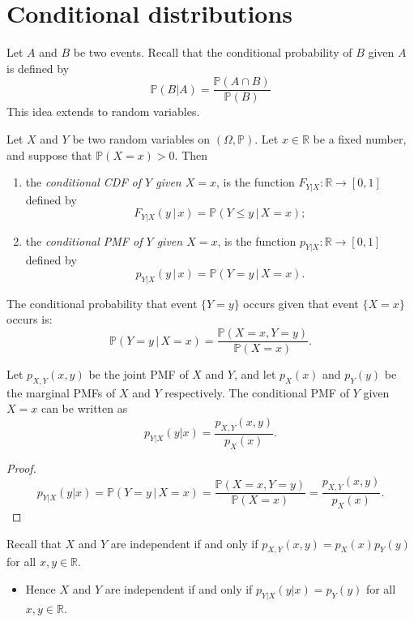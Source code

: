 \documentclass[lecture]{csm}
\newcommand{\R}{\mathbb{R}}
\newcommand{\prob}{\mathbb{P}}
\def\it{\item}
\def\bit{\begin{itemize}}
\def\eit{\end{itemize}}
\def\ben{\begin{enumerate}}
\def\een{\end{enumerate}}
\begin{document}
\maketitle
\tableofcontents


\section{Conditional distributions}
Let $A$ and $B$ be two events. Recall that the conditional probability of $B$ given $A$ is defined by
\[
\prob(B|A) = \frac{\prob(A\cap B)}{\prob(B)}
\]
This idea extends to random variables. 

\begin{definition}
Let $X$ and $Y$ be two random variables on $(\Omega,\prob)$. Let $x\in\R$ be a fixed number, and suppose that $\prob(X=x)>0$. Then
\ben
\it the \emph{conditional CDF of $Y$ given $X=x$}, is the function $F_{Y|X}:\R\to [0,1]$ defined by 
\[
F_{Y|X}(y\,|\,x) = \prob(Y\leq y\,|\,X=x);
\]
\it the \emph{conditional PMF of $Y$ given $X=x$}, is the function $p_{Y|X}:\R\to [0,1]$ defined by 
\[
p_{Y|X}(y\,|\,x) = \prob(Y=y\,|\,X=x).
\]
\een
\end{definition}
\break %

The conditional probability that event $\{Y=y\}$ occurs given that event $\{X=x\}$ occurs is:
\[
\prob(Y=y\,|\,X=x) = \displaystyle\frac{\prob(X=x,Y=y)}{\prob(X=x)}.
\]
\begin{lemma}
Let $p_{X,Y}(x,y)$ be the joint PMF of $X$ and $Y$, and let $p_X(x)$ and $p_Y(y)$ be the marginal PMFs of $X$ and $Y$ respectively. The conditional PMF of $Y$ given $X=x$ can be written as 
\[
p_{Y|X}(y|x) = \displaystyle \frac{p_{X,Y}(x,y)}{p_X(x)}.
\]
\end{lemma}

\begin{proof}
\[
p_{Y|X}(y|x) = \prob(Y=y\,|\,X=x) = \frac{\prob(X=x,Y=y)}{\prob(X=x)} = \frac{p_{X,Y}(x,y)}{p_X(x)}.
\]
\end{proof}
\par
Recall that $X$ and $Y$ are independent if and only if $p_{X,Y}(x,y)=p_X(x)p_Y(y)$ for all $x,y\in\R$.
\bit
\it Hence $X$ and $Y$ are independent if and only if $p_{Y|X}(y|x) = p_Y(y)$ for all $x,y\in\R$.
\eit
\end{document}
